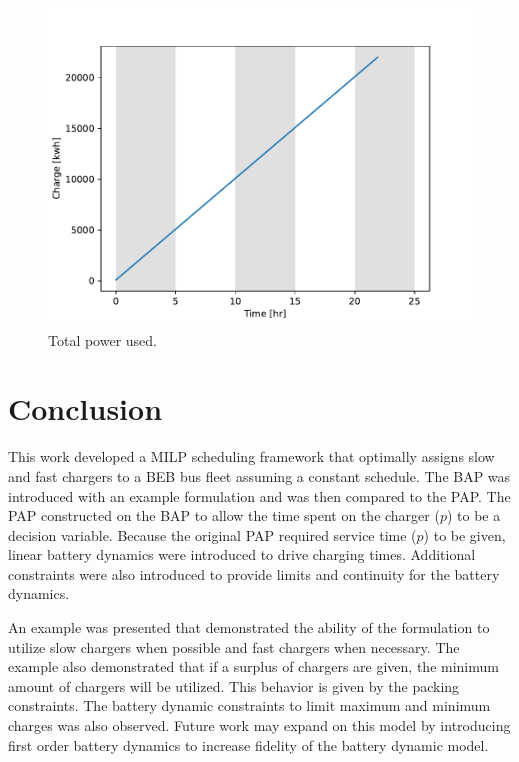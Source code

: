 \documentclass[letterpaper, 10pt, conference]{IEEEtran}
\begin{document}
\begin{figure}[ht]
	\centering
	\includegraphics[trim=0in 0in 0in 0.5in, width=0.75\linewidth]{usage.pdf}
	\caption{Total power used.}
	\label{fig:usage}
\end{figure}

\section{Conclusion}
\label{sec:conclusion}
This work developed a MILP scheduling framework that optimally assigns slow and fast chargers to a BEB bus fleet assuming a constant schedule. The BAP was introduced with an example formulation and was then compared to the PAP. The PAP constructed on the BAP to allow the time spent on the charger (\(p\)) to be a decision variable. Because the original PAP required service time (\(p\)) to be given, linear battery dynamics were introduced to drive charging times. Additional constraints were also introduced to provide limits and continuity for the battery dynamics.

An example was presented that demonstrated the ability of the formulation to utilize slow chargers when possible and fast chargers when necessary. The example also demonstrated that if a surplus of chargers are given, the minimum amount of chargers will be utilized. This behavior is given by the packing constraints. The battery dynamic constraints to limit maximum and minimum charges was also observed. Future work may expand on this model by introducing first order battery dynamics to increase fidelity of the battery dynamic model.




\end{document}
